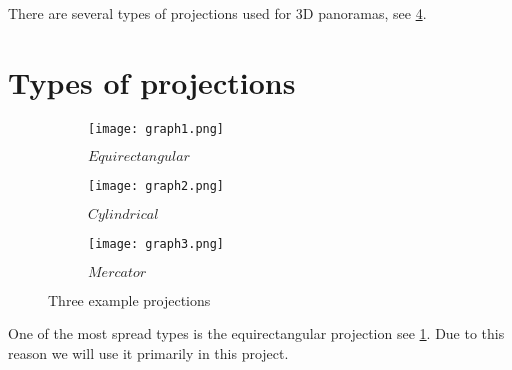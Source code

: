 There are several types of projections used for 3D panoramas, see \ref{fig:three_projections}.


\section{Types of projections}



\begin{figure}[h]
	\centering
	\begin{subfigure}[b]{0.3\textwidth}
		\centering
		\texttt{[image: graph1.png]}
		\caption{$Equirectangular$}
		\label{fig:equirectangular}
	\end{subfigure}
	\hfill
	\begin{subfigure}[b]{0.3\textwidth}
		\centering
		\texttt{[image: graph2.png]}
		\caption{$Cylindrical$}
		\label{fig:cylindrical}
	\end{subfigure}
	\hfill
	\begin{subfigure}[b]{0.3\textwidth}
		\centering
		\texttt{[image: graph3.png]}
		\caption{$Mercator$}
		\label{fig:mercator}
	\end{subfigure}
	\caption{Three example projections}
	\label{fig:three_projections}
\end{figure}

One of the most spread types is the equirectangular projection see \ref{fig:equirectangular}. Due to this reason we will use it primarily in this project.

